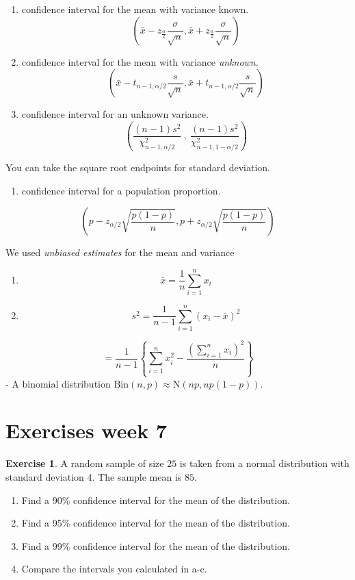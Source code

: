 \documentclass[
]{book}
\providecommand{\tightlist}{%
  \setlength{\itemsep}{0pt}\setlength{\parskip}{0pt}}
\theoremstyle{definition}
\theoremstyle{definition}
\theoremstyle{definition}
\newtheorem{exercise}{Exercise}[chapter]
\theoremstyle{definition}
\theoremstyle{remark}
\begin{document}
\begin{enumerate}
\def\labelenumi{\arabic{enumi})}
\item
  confidence interval for the mean with variance known.
  \[\left( \bar{x}-z_{\frac{\alpha}{2}}\frac{\sigma}{\sqrt{n}},\bar{x}+z_{\frac{\alpha}{2}}\frac{\sigma}{\sqrt{n}} \right) \]
\item
  confidence interval for the mean with variance \emph{unknown}.
  \[\left( \bar{x} - t_{n-1,\alpha /2} \frac{s}{\sqrt{n}}, \bar{x} + t_{n-1,\alpha /2} \frac{s}{\sqrt{n}}\right)  \]
\item
  confidence interval for an unknown variance.
  \[\left( \frac{(n-1)s^2}{\chi^2_{n-1,\alpha / 2}} \ , \ \frac{(n-1)s^2}{\chi^2_{n-1,1-\alpha / 2}}\right) \]
\end{enumerate}

You can take the square root endpoints for standard deviation.

\begin{enumerate}
\def\labelenumi{\arabic{enumi})}
\setcounter{enumi}{3}
\tightlist
\item
  confidence interval for a population proportion.
\end{enumerate}

\[\left(p - z_{\alpha/2}\sqrt{\frac{p(1-p)}{n}}, p + z_{\alpha/2}\sqrt{\frac{p(1-p)}{n}}\right)\]

We used \emph{unbiased estimates} for the mean and variance

\begin{enumerate}
\def\labelenumi{\arabic{enumi}.}
\item
  \[\bar{x} = \frac{1}{n}\sum_{i=1}^n x_i\]
\item
  \[s^2 = \frac{1}{n-1}\sum_{i=1}^n (x_i - \bar{x})^2 \]
\end{enumerate}

\[=\frac{1}{n-1}\left\{\sum_{i=1}^nx_i^2 - \frac{\left(\sum_{i=1}^n x_i\right)^2}{n} \right\} \]
- A binomial distribution \(\text{Bin}(n,p) \approx \text{N}(np, np(1-p))\).

\hypertarget{exercises-week-7}{%
\section{Exercises week 7}\label{exercises-week-7}}

\begin{exercise}

A random sample of size \(25\) is taken from a normal distribution with standard deviation \(4\). The sample mean is \(85\).

\begin{enumerate}
\def\labelenumi{\alph{enumi}.}
\item
  Find a 90\% confidence interval for the mean of the distribution.
\item
  Find a 95\% confidence interval for the mean of the distribution.
\item
  Find a 99\% confidence interval for the mean of the distribution.
\item
  Compare the intervals you calculated in a-c.
\end{enumerate}

\end{exercise}
\end{document}
